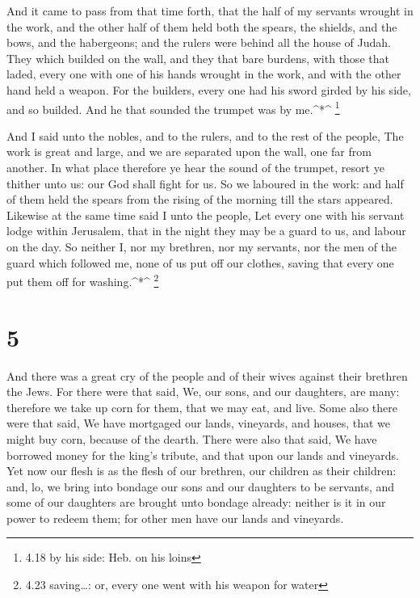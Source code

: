  And it came to pass from that time forth, that the half of
my servants wrought in the work, and the other half of them held both
the spears, the shields, and the bows, and the habergeons; and the
rulers were behind all the house of Judah.  They which
builded on the wall, and they that bare burdens, with those that laded,
every one with one of his hands wrought in the work, and with the other
hand held a weapon.  For the builders, every one had his
sword girded by his side, and so builded. And he that sounded the
trumpet was by me.\^{}*\^{} \footnote{4.18 by his side: Heb. on his
  loins}

 And I said unto the nobles, and to the rulers, and to the
rest of the people, The work is great and large, and we are separated
upon the wall, one far from another.  In what place
therefore ye hear the sound of the trumpet, resort ye thither unto us:
our God shall fight for us.  So we laboured in the work:
and half of them held the spears from the rising of the morning till the
stars appeared.  Likewise at the same time said I unto the
people, Let every one with his servant lodge within Jerusalem, that in
the night they may be a guard to us, and labour on the day.
 So neither I, nor my brethren, nor my servants, nor the
men of the guard which followed me, none of us put off our clothes,
saving that every one put them off for washing.\^{}*\^{} \footnote{4.23
  saving\ldots: or, every one went with his weapon for water}

\hypertarget{section-4}{%
\section{5}\label{section-4}}

 And there was a great cry of the people and of their wives
against their brethren the Jews.  For there were that said,
We, our sons, and our daughters, are many: therefore we take up corn for
them, that we may eat, and live.  Some also there were that
said, We have mortgaged our lands, vineyards, and houses, that we might
buy corn, because of the dearth.  There were also that said,
We have borrowed money for the king's tribute, and that upon our lands
and vineyards.  Yet now our flesh is as the flesh of our
brethren, our children as their children: and, lo, we bring into bondage
our sons and our daughters to be servants, and some of our daughters are
brought unto bondage already: neither is it in our power to redeem them;
for other men have our lands and vineyards.

